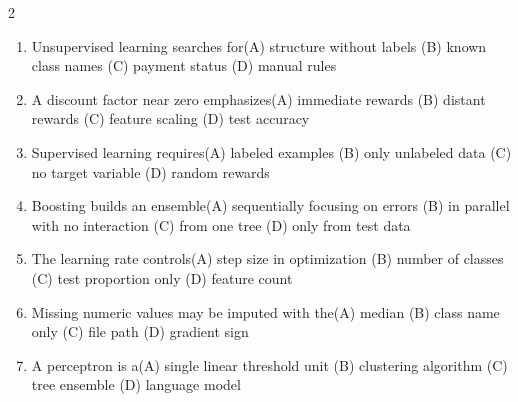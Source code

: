 \documentclass[a4paper]{article}
\begin{document}
\begin{multicols*}{2}
\begin{enumerate}
\item Unsupervised learning searches for\newline\hspace*{0.6em}(A) structure without labels \quad (B) known class names \newline\hspace*{0.6em}(C) payment status \quad (D) manual rules
\item A discount factor near zero emphasizes\newline\hspace*{0.6em}(A) immediate rewards \quad (B) distant rewards \newline\hspace*{0.6em}(C) feature scaling \quad (D) test accuracy
\item Supervised learning requires\newline\hspace*{0.6em}(A) labeled examples \quad (B) only unlabeled data \newline\hspace*{0.6em}(C) no target variable \quad (D) random rewards
\item Boosting builds an ensemble\newline\hspace*{0.6em}(A) sequentially focusing on errors \quad (B) in parallel with no interaction \newline\hspace*{0.6em}(C) from one tree \quad (D) only from test data
\item The learning rate controls\newline\hspace*{0.6em}(A) step size in optimization \quad (B) number of classes \newline\hspace*{0.6em}(C) test proportion only \quad (D) feature count
\item Missing numeric values may be imputed with the\newline\hspace*{0.6em}(A) median \quad (B) class name only \newline\hspace*{0.6em}(C) file path \quad (D) gradient sign
\item A perceptron is a\newline\hspace*{0.6em}(A) single linear threshold unit \quad (B) clustering algorithm \newline\hspace*{0.6em}(C) tree ensemble \quad (D) language model

\end{enumerate}
\end{multicols*}
\end{document}
